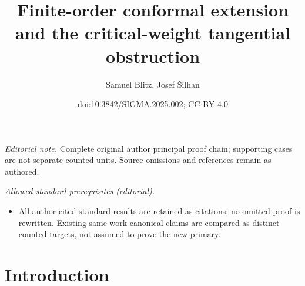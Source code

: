 \documentclass[10pt,a4paper]{article}
\title{Finite-order conformal extension and the critical-weight tangential obstruction}
\author{Samuel Blitz, Josef Šilhan}
\date{doi:10.3842/SIGMA.2025.002; CC BY 4.0}
\numberwithin{equation}{section}
\renewcommand{\=}{\stackrel \Lambda =}
\begin{document}
\maketitle
\noindent\textit{Editorial note.} Complete original author principal proof chain; supporting cases are not separate counted units. Source omissions and references remain as authored.\par\medskip
\noindent\textit{Allowed standard prerequisites (editorial).}\begin{itemize}
\item All author-cited standard results are retained as citations; no omitted proof is rewritten. Existing same-work canonical claims are compared as distinct counted targets, not assumed to prove the new primary.
\end{itemize}\medskip
\section{Introduction}
\end{document}
